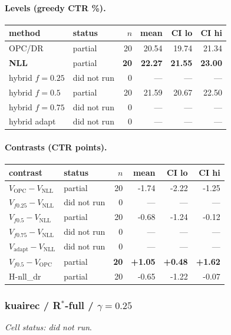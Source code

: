 \documentclass[10pt,a4paper]{article}
\begin{document}
\paragraph{Levels (greedy CTR \%).}
{\centering\small\begin{tabular}{llrrrr}
\toprule method & status & $n$ & mean & CI lo & CI hi \\
\midrule
OPC/DR & partial & 20 & 20.54 & 19.74 & 21.34 \\
\textbf{NLL} & partial & \textbf{20} & \textbf{22.27} & \textbf{21.55} & \textbf{23.00} \\
hybrid $f{=}0.25$ & did not run & 0 & --- & --- & --- \\
hybrid $f{=}0.5$ & partial & 20 & 21.59 & 20.67 & 22.50 \\
hybrid $f{=}0.75$ & did not run & 0 & --- & --- & --- \\
hybrid adapt & did not run & 0 & --- & --- & --- \\
\bottomrule\end{tabular}\par}
\paragraph{Contrasts (CTR points).}
{\centering\small\begin{tabular}{llrrrr}
\toprule contrast & status & $n$ & mean & CI lo & CI hi \\
\midrule
$V_{\mathrm{OPC}}-V_{\mathrm{NLL}}$ & partial & 20 & -1.74 & -2.22 & -1.25 \\
$V_{f0.25}-V_{\mathrm{NLL}}$ & did not run & 0 & --- & --- & --- \\
$V_{f0.5}-V_{\mathrm{NLL}}$ & partial & 20 & -0.68 & -1.24 & -0.12 \\
$V_{f0.75}-V_{\mathrm{NLL}}$ & did not run & 0 & --- & --- & --- \\
$V_{\mathrm{adapt}}-V_{\mathrm{NLL}}$ & did not run & 0 & --- & --- & --- \\
\textbf{$V_{f0.5}-V_{\mathrm{OPC}}$} & partial & \textbf{20} & \textbf{+1.05} & \textbf{+0.48} & \textbf{+1.62} \\
H-nll\_dr & partial & 20 & -0.65 & -1.22 & -0.07 \\
\bottomrule\end{tabular}\par}
\bigskip
\subsubsection{kuairec / R$^*$-full / $\gamma=0.25$}
\emph{Cell status: did not run}.
\end{document}

